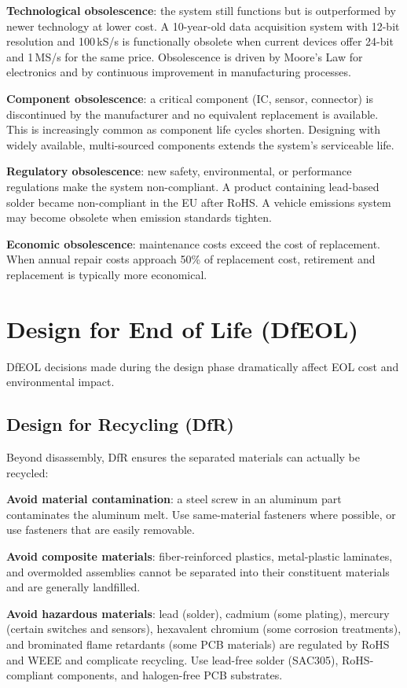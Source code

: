 \textbf{Technological obsolescence}: the system still functions but is outperformed by newer technology at lower cost. A 10-year-old data acquisition system with 12-bit resolution and 100\,kS/s is functionally obsolete when current devices offer 24-bit and 1\,MS/s for the same price. Obsolescence is driven by Moore's Law for electronics and by continuous improvement in manufacturing processes.

\textbf{Component obsolescence}: a critical component (IC, sensor, connector) is discontinued by the manufacturer and no equivalent replacement is available. This is increasingly common as component life cycles shorten. Designing with widely available, multi-sourced components extends the system's serviceable life.

\textbf{Regulatory obsolescence}: new safety, environmental, or performance regulations make the system non-compliant. A product containing lead-based solder became non-compliant in the EU after RoHS. A vehicle emissions system may become obsolete when emission standards tighten.

\textbf{Economic obsolescence}: maintenance costs exceed the cost of replacement. When annual repair costs approach 50\% of replacement cost, retirement and replacement is typically more economical.

\section{Design for End of Life (DfEOL)}
DfEOL decisions made during the design phase dramatically affect EOL cost and environmental impact.

\subsection{Design for Recycling (DfR)}
Beyond disassembly, DfR ensures the separated materials can actually be recycled:

\textbf{Avoid material contamination}: a steel screw in an aluminum part contaminates the aluminum melt. Use same-material fasteners where possible, or use fasteners that are easily removable.

\textbf{Avoid composite materials}: fiber-reinforced plastics, metal-plastic laminates, and overmolded assemblies cannot be separated into their constituent materials and are generally landfilled.

\textbf{Avoid hazardous materials}: lead (solder), cadmium (some plating), mercury (certain switches and sensors), hexavalent chromium (some corrosion treatments), and brominated flame retardants (some PCB materials) are regulated by RoHS and WEEE and complicate recycling. Use lead-free solder (SAC305), RoHS-compliant components, and halogen-free PCB substrates.


